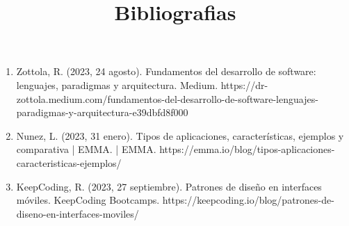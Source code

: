 \documentclass[12pt,twocolumn]{article}
\begin{document}
\newpage
\title{\textbf{\huge 
		Bibliografias}}
	
\begin{enumerate}
	\item Zottola, R. (2023, 24 agosto). Fundamentos del desarrollo de software: lenguajes, paradigmas y arquitectura. Medium. https://dr-zottola.medium.com/fundamentos-del-desarrollo-de-software-lenguajes-paradigmas-y-arquitectura-e39dbfd8f000
	\item Nunez, L. (2023, 31 enero). Tipos de aplicaciones, características, ejemplos y comparativa | EMMA. | EMMA. https://emma.io/blog/tipos-aplicaciones-caracteristicas-ejemplos/
	\item KeepCoding, R. (2023, 27 septiembre). Patrones de diseño en interfaces móviles. KeepCoding Bootcamps. https://keepcoding.io/blog/patrones-de-diseno-en-interfaces-moviles/
\end{enumerate}
\end{document}
